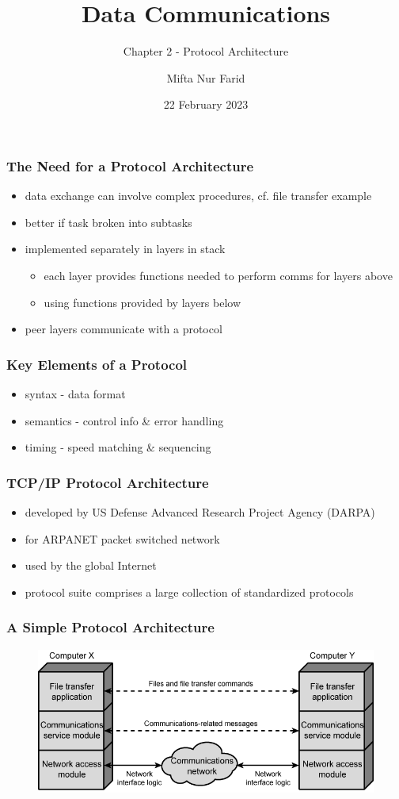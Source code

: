 \documentclass[pdflatex,compress]{beamer}
\title{Data Communications}
\subtitle{Chapter 2 - Protocol Architecture}
\author{Mifta Nur Farid}
\date{22 February 2023}
\begin{document}
\maketitle

\begin{frame}
	\frametitle{The Need for a Protocol Architecture}
	\begin{itemize}
		\item data exchange can involve complex
		procedures, cf. file transfer example
		\item better if task broken into subtasks
		\item implemented separately in layers in stack
		\begin{itemize}
			\item each layer provides functions needed to
			perform comms for layers above
			\item using functions provided by layers below
		\end{itemize}
		\item peer layers communicate with a protocol
	\end{itemize}
\end{frame}

\begin{frame}
	\frametitle{Key Elements of a Protocol}
	\begin{itemize}
		\item syntax - data format
		\item semantics - control info \& error handling
		\item timing - speed matching \& sequencing
	\end{itemize}
\end{frame}

\begin{frame}
	\frametitle{TCP/IP Protocol Architecture}
	\begin{itemize}
		\item developed by US Defense Advanced Research Project Agency (DARPA)
		\item for ARPANET packet switched network
		\item used by the global Internet
		\item protocol suite comprises a large collection of standardized protocols
	\end{itemize}
\end{frame}

\begin{frame}
	\frametitle{A Simple Protocol Architecture}
	\begin{figure}
		\centering
		\includegraphics[width=\linewidth]{img/img01}
	\end{figure}
\end{frame}
\end{document}
